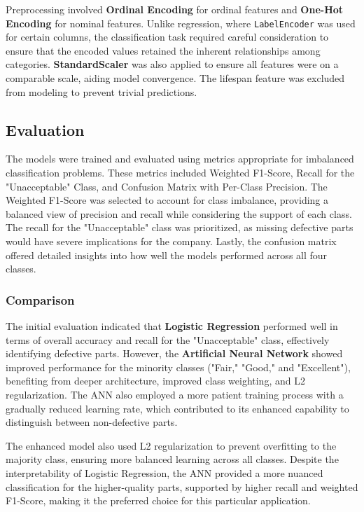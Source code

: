 \documentclass{article}
\begin{document}
Preprocessing involved \textbf{Ordinal Encoding} for ordinal features and \textbf{One-Hot Encoding} for nominal features. Unlike regression, where \texttt{LabelEncoder} was used for certain columns, the classification task required careful consideration to ensure that the encoded values retained the inherent relationships among categories. \textbf{StandardScaler} was also applied to ensure all features were on a comparable scale, aiding model convergence. The lifespan feature was excluded from modeling to prevent trivial predictions.

\subsection{Evaluation}

The models were trained and evaluated using metrics appropriate for imbalanced classification problems. These metrics included Weighted F1-Score, Recall for the "Unacceptable" Class, and Confusion Matrix with Per-Class Precision. The Weighted F1-Score was selected to account for class imbalance, providing a balanced view of precision and recall while considering the support of each class. The recall for the "Unacceptable" class was prioritized, as missing defective parts would have severe implications for the company. Lastly, the confusion matrix offered detailed insights into how well the models performed across all four classes.

\subsubsection{Comparison}

The initial evaluation indicated that \textbf{Logistic Regression} performed well in terms of overall accuracy and recall for the "Unacceptable" class, effectively identifying defective parts. However, the \textbf{Artificial Neural Network} showed improved performance for the minority classes ("Fair," "Good," and "Excellent"), benefiting from deeper architecture, improved class weighting, and L2 regularization. The ANN also employed a more patient training process with a gradually reduced learning rate, which contributed to its enhanced capability to distinguish between non-defective parts.

The enhanced model also used L2 regularization to prevent overfitting to the majority class, ensuring more balanced learning across all classes. Despite the interpretability of Logistic Regression, the ANN provided a more nuanced classification for the higher-quality parts, supported by higher recall and weighted F1-Score, making it the preferred choice for this particular application.
\end{document}

